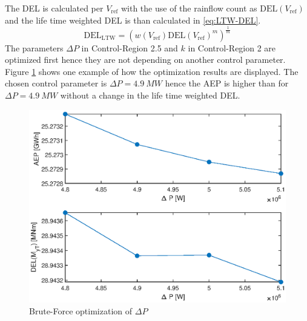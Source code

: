 The DEL is calculated per $V_{\text{ref}}$ with the use of the rainflow count as $\text{DEL}(V_{\text{ref}})$ and the life time weighted DEL is than calculated in \ref{eq:LTW-DEL}.
\begin{equation}
	\text{DEL}_{\text{LTW}} = \left(w(V_{\text{ref}})\text{DEL}(V_{\text{ref}})^m\right)^{\frac{1}{m}} 
	\label{eq:LTW-DEL}
\end{equation}
The parameters $\Delta P$ in Control-Region 2.5 and  $k$ in Control-Region 2 are optimized first hence they are not depending on another control parameter. Figure \ref{fig:DeltaP} shows one example of how the optimization results are displayed. The chosen control parameter is $\Delta P = \SI{4.9}{MW}$ hence the AEP is higher than for $\Delta P = \SI{4.9}{MW}$ without a change in the life time weighted DEL.
\begin{figure}[tbh]
	\centering	
	\includegraphics[width=12cm]{Figures/DeltaPopt.eps}
	\caption{Brute-Force optimization of $\Delta P$}
	\label{fig:DeltaP}
\end{figure}
